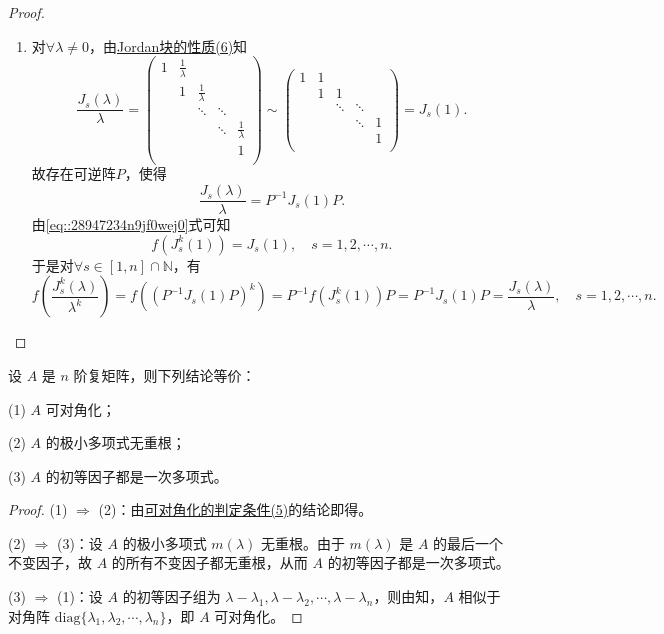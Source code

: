 \documentclass[../../main.tex]{subfiles}
\begin{document}
\begin{proof}
\begin{enumerate}[(1)]
\item 对$\forall \lambda \ne 0$，由\hyperref[proposition:Jordan块的性质]{Jordan块的性质(6)}知
\[
\frac{J_s\left( \lambda \right)}{\lambda}=\begin{pmatrix}
1&		\frac{1}{\lambda}&		&		&		\\
&		1&		\frac{1}{\lambda}&		&		\\
&		&		\ddots&		\ddots&		\\
&		&		&		\ddots&		\frac{1}{\lambda}\\
&		&		&		&		1\\
\end{pmatrix} \sim \begin{pmatrix}
1&		1&		&		&		\\
&		1&		1&		&		\\
&		&		\ddots&		\ddots&		\\
&		&		&		\ddots&		1\\
&		&		&		&		1\\
\end{pmatrix} =J_s\left( 1 \right) .
\]
故存在可逆阵$P$，使得
\[
\frac{J_s\left( \lambda \right)}{\lambda}=P^{-1}J_s\left( 1 \right) P.
\]
由\eqref{eq::28947234n9jf0wej0}式可知
\[
f\left( J_{s}^{k}\left( 1 \right) \right) =J_s\left( 1 \right) ,\quad s=1,2,\cdots ,n.
\]
于是对$\forall s\in \left[ 1,n \right] \cap \mathbb{N}$，有
\[
f\left( \frac{J_{s}^{k}\left( \lambda \right)}{\lambda ^k} \right) =f\left( \left( P^{-1}J_s\left( 1 \right) P \right) ^k \right) =P^{-1}f\left( J_{s}^{k}\left( 1 \right) \right) P=P^{-1}J_s\left( 1 \right) P=\frac{J_s\left( \lambda \right)}{\lambda},\quad s=1,2,\cdots ,n.
\]
\end{enumerate}

\end{proof}

\begin{corollary}
设 $A$ 是 $n$ 阶复矩阵，则下列结论等价：

(1) $A$ 可对角化；

(2) $A$ 的极小多项式无重根；

(3) $A$ 的初等因子都是一次多项式。
\end{corollary}
\begin{proof}
(1) $\Rightarrow$ (2)：由\hyperref[theorem:可对角化的判定条件]{可对角化的判定条件(5)}的结论即得。

(2) $\Rightarrow$ (3)：设 $A$ 的极小多项式 $m(\lambda)$ 无重根。由于 $m(\lambda)$ 是 $A$ 的最后一个不变因子，故 $A$ 的所有不变因子都无重根，从而 $A$ 的初等因子都是一次多项式。

(3) $\Rightarrow$ (1)：设 $A$ 的初等因子组为 $\lambda - \lambda_1,\lambda - \lambda_2,\cdots,\lambda - \lambda_n$，则由知，$A$ 相似于对角阵 $\mathrm{diag}\{\lambda_1,\lambda_2,\cdots,\lambda_n\}$，即 $A$ 可对角化。

\end{proof}
\end{document}
